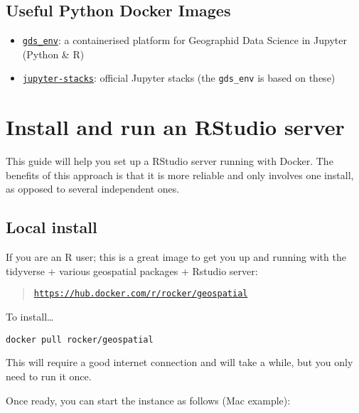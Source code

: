 \documentclass[
]{book}
\providecommand{\tightlist}{%
  \setlength{\itemsep}{0pt}\setlength{\parskip}{0pt}}
\begin{document}
\hypertarget{useful-python-docker-images}{%
\section{Useful Python Docker Images}\label{useful-python-docker-images}}

\begin{itemize}
\tightlist
\item
  \href{https://github.com/darribas/gds_env}{\texttt{gds\_env}}: a containerised platform
  for Geographid Data Science in Jupyter (Python \& R)
\item
  \href{https://github.com/jupyter/docker-stacks}{\texttt{jupyter-stacks}}: official
  Jupyter stacks (the \texttt{gds\_env} is based on these)
\end{itemize}

\hypertarget{install-and-run-an-rstudio-server}{%
\chapter{Install and run an RStudio server}\label{install-and-run-an-rstudio-server}}

This guide will help you set up a RStudio server running with Docker. The
benefits of this approach is that it is more reliable and only involves one
install, as opposed to several independent ones.

\hypertarget{local-install-1}{%
\section{Local install}\label{local-install-1}}

If you are an R user; this is a great image to get you up and running with the tidyverse + various geospatial packages + Rstudio server:

\begin{quote}
\href{https://hub.docker.com/r/rocker/geospatial}{\texttt{https://hub.docker.com/r/rocker/geospatial}}
\end{quote}

To install\ldots{}

\begin{verbatim}
docker pull rocker/geospatial
\end{verbatim}

This will require a good internet connection and will take a while, but you
only need to run it once.

Once ready, you can start the instance as follows (Mac example):
\end{document}

